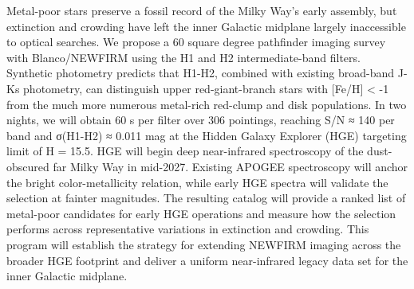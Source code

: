 Metal-poor stars preserve a fossil record of the Milky Way’s early assembly, but extinction and crowding have left the inner Galactic midplane largely inaccessible to optical searches. We propose a 60 square degree pathfinder imaging survey with Blanco/NEWFIRM using the H1 and H2 intermediate-band filters. Synthetic photometry predicts that H1-H2, combined with existing broad-band J-Ks photometry, can distinguish upper red-giant-branch stars with [Fe/H] < -1 from the much more numerous metal-rich red-clump and disk populations. In two nights, we will obtain 60 s per filter over 306 pointings, reaching S/N ≈ 140 per band and σ(H1-H2) ≈ 0.011 mag at the Hidden Galaxy Explorer (HGE) targeting limit of H = 15.5. HGE will begin deep near-infrared spectroscopy of the dust-obscured far Milky Way in mid-2027. Existing APOGEE spectroscopy will anchor the bright color-metallicity relation, while early HGE spectra will validate the selection at fainter magnitudes. The resulting catalog will provide a ranked list of metal-poor candidates for early HGE operations and measure how the selection performs across representative variations in extinction and crowding. This program will establish the strategy for extending NEWFIRM imaging across the broader HGE footprint and deliver a uniform near-infrared legacy data set for the inner Galactic midplane.